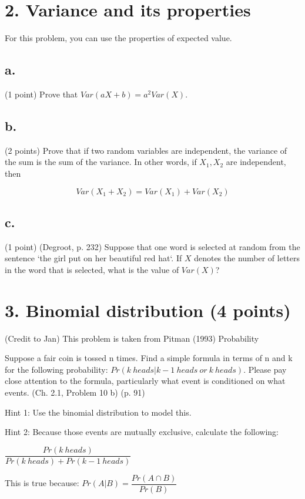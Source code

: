 \documentclass{article}\usepackage[]{graphicx}\usepackage[]{color}
\begin{document}
\section*{2. Variance and its properties}

For this problem, you can use the properties of expected value.

\subsection*{a.} (1 point) Prove that $Var(aX + b) = a^2 Var(X)$.

\subsection*{b.} (2 points) Prove that if two random variables are independent, the variance of the sum is the sum of the variance. In other words, if $X_1, X_2$ are independent, then

$$Var(X_1 + X_2) = Var(X_1) + Var(X_2)$$

\subsection*{c.} (1 point) (Degroot, p. 232) Suppose that one word is selected at random from the sentence `the girl put on her beautiful red hat`. If $X$ denotes the number of letters in the word that is selected, what is the value of $Var(X)$?


\section*{3. Binomial distribution (4 points)}

(Credit to Jan) This problem is taken from Pitman (1993) Probability

Suppose a fair coin is tossed n times. Find a simple formula in terms of n and k for the following probability: $Pr(k\ heads | k-1\ heads\ or\ k\ heads)$. Please pay close attention to the formula, particularly what event is conditioned on what events. (Ch. 2.1, Problem 10 b) (p. 91)

Hint 1: Use the binomial distribution to model this.

Hint 2: Because those events are mutually exclusive, calculate the following:

$\dfrac{Pr(k\ heads)}{Pr (k\ heads) + Pr (k-1\ heads)}$

This is true because: $Pr(A | B) = \dfrac{Pr (A \cap B)}{Pr (B)}$
\end{document}
